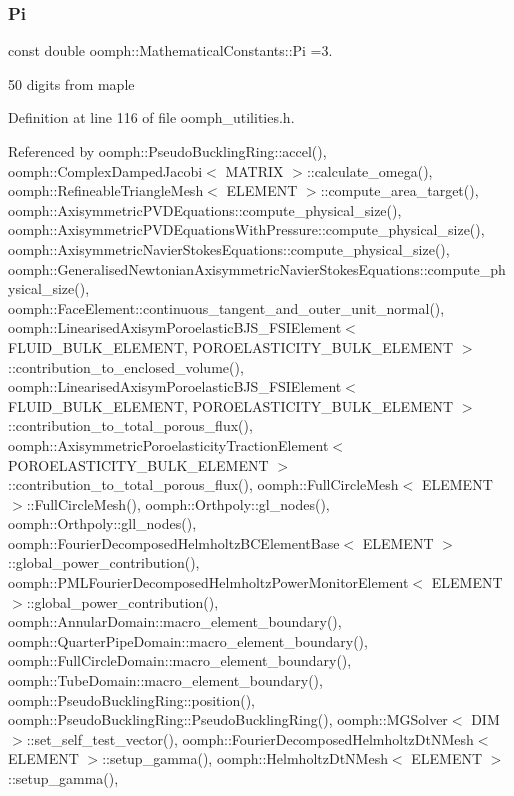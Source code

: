 \subsubsection{\texorpdfstring{Pi}{Pi}}
{\footnotesize\ttfamily const double oomph\+::\+Mathematical\+Constants\+::\+Pi =3.}



50 digits from maple 



Definition at line 116 of file oomph\+\_\+utilities.\+h.



Referenced by oomph\+::\+Pseudo\+Buckling\+Ring\+::accel(), oomph\+::\+Complex\+Damped\+Jacobi$<$ M\+A\+T\+R\+I\+X $>$\+::calculate\+\_\+omega(), oomph\+::\+Refineable\+Triangle\+Mesh$<$ E\+L\+E\+M\+E\+N\+T $>$\+::compute\+\_\+area\+\_\+target(), oomph\+::\+Axisymmetric\+P\+V\+D\+Equations\+::compute\+\_\+physical\+\_\+size(), oomph\+::\+Axisymmetric\+P\+V\+D\+Equations\+With\+Pressure\+::compute\+\_\+physical\+\_\+size(), oomph\+::\+Axisymmetric\+Navier\+Stokes\+Equations\+::compute\+\_\+physical\+\_\+size(), oomph\+::\+Generalised\+Newtonian\+Axisymmetric\+Navier\+Stokes\+Equations\+::compute\+\_\+physical\+\_\+size(), oomph\+::\+Face\+Element\+::continuous\+\_\+tangent\+\_\+and\+\_\+outer\+\_\+unit\+\_\+normal(), oomph\+::\+Linearised\+Axisym\+Poroelastic\+B\+J\+S\+\_\+\+F\+S\+I\+Element$<$ F\+L\+U\+I\+D\+\_\+\+B\+U\+L\+K\+\_\+\+E\+L\+E\+M\+E\+N\+T, P\+O\+R\+O\+E\+L\+A\+S\+T\+I\+C\+I\+T\+Y\+\_\+\+B\+U\+L\+K\+\_\+\+E\+L\+E\+M\+E\+N\+T $>$\+::contribution\+\_\+to\+\_\+enclosed\+\_\+volume(), oomph\+::\+Linearised\+Axisym\+Poroelastic\+B\+J\+S\+\_\+\+F\+S\+I\+Element$<$ F\+L\+U\+I\+D\+\_\+\+B\+U\+L\+K\+\_\+\+E\+L\+E\+M\+E\+N\+T, P\+O\+R\+O\+E\+L\+A\+S\+T\+I\+C\+I\+T\+Y\+\_\+\+B\+U\+L\+K\+\_\+\+E\+L\+E\+M\+E\+N\+T $>$\+::contribution\+\_\+to\+\_\+total\+\_\+porous\+\_\+flux(), oomph\+::\+Axisymmetric\+Poroelasticity\+Traction\+Element$<$ P\+O\+R\+O\+E\+L\+A\+S\+T\+I\+C\+I\+T\+Y\+\_\+\+B\+U\+L\+K\+\_\+\+E\+L\+E\+M\+E\+N\+T $>$\+::contribution\+\_\+to\+\_\+total\+\_\+porous\+\_\+flux(), oomph\+::\+Full\+Circle\+Mesh$<$ E\+L\+E\+M\+E\+N\+T $>$\+::\+Full\+Circle\+Mesh(), oomph\+::\+Orthpoly\+::gl\+\_\+nodes(), oomph\+::\+Orthpoly\+::gll\+\_\+nodes(), oomph\+::\+Fourier\+Decomposed\+Helmholtz\+B\+C\+Element\+Base$<$ E\+L\+E\+M\+E\+N\+T $>$\+::global\+\_\+power\+\_\+contribution(), oomph\+::\+P\+M\+L\+Fourier\+Decomposed\+Helmholtz\+Power\+Monitor\+Element$<$ E\+L\+E\+M\+E\+N\+T $>$\+::global\+\_\+power\+\_\+contribution(), oomph\+::\+Annular\+Domain\+::macro\+\_\+element\+\_\+boundary(), oomph\+::\+Quarter\+Pipe\+Domain\+::macro\+\_\+element\+\_\+boundary(), oomph\+::\+Full\+Circle\+Domain\+::macro\+\_\+element\+\_\+boundary(), oomph\+::\+Tube\+Domain\+::macro\+\_\+element\+\_\+boundary(), oomph\+::\+Pseudo\+Buckling\+Ring\+::position(), oomph\+::\+Pseudo\+Buckling\+Ring\+::\+Pseudo\+Buckling\+Ring(), oomph\+::\+M\+G\+Solver$<$ D\+I\+M $>$\+::set\+\_\+self\+\_\+test\+\_\+vector(), oomph\+::\+Fourier\+Decomposed\+Helmholtz\+Dt\+N\+Mesh$<$ E\+L\+E\+M\+E\+N\+T $>$\+::setup\+\_\+gamma(), oomph\+::\+Helmholtz\+Dt\+N\+Mesh$<$ E\+L\+E\+M\+E\+N\+T $>$\+::setup\+\_\+gamma(), 